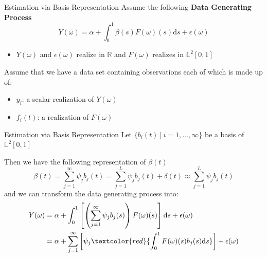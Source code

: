 \documentclass{beamer}
\begin{document}

	\begin{frame}{Estimation via Basis Representation}
		Assume the following \textbf{Data Generating Process}
		$$Y(\omega) = \alpha + \int_{0}^{1} \beta(s) F(\omega)(s) \mathrm{d}s + \epsilon(\omega)$$
		\begin{itemize}
			\item $Y(\omega)$ and $\epsilon(\omega)$ realize in $\mathbb{R}$ and $F(\omega)$ realizes in $\mathbb{L}^2[0,1]$
		\end{itemize}
		\vspace{0.2cm}
		
		Assume that we have a data set containing observations each of which is made up of:
		\begin{itemize}
			\item $y_i$: a scalar realization of $Y(\omega)$
			\item $f_i(t)$: a realization of $F(\omega)$
		\end{itemize}

	\end{frame}

	\begin{frame}{Estimation via Basis Representation}
		Let $\{b_i(t) \: \vert \: i = 1, \dots, \infty\}$ be a basis of $\mathbb{L}^2[0,1]$
		\vspace{0.2cm}
		
		Then we have the following representation of $\beta(t)$
		$$\beta(t) = \sum_{j = 1}^{\infty} \psi_j b_j(t) = \sum_{j = 1}^{L} \psi_j b_j(t) + \delta(t) \approx \sum_{j = 1}^{L} \psi_j b_j(t)$$
		and we can transform the data generating process into:
		\begin{equation}\notag
			\begin{split}
				Y(\omega) & = \alpha + \int_{0}^{1}\left[\left(\sum_{j = 1}^{\infty} \psi_j  b_j(s)\right) F(\omega)(s) \right]\mathrm{d}s + \epsilon(\omega) \\
						  & = \alpha + \sum_{j = 1}^{\infty} \left[\psi_j \textcolor{red}{\int_{0}^{1} F(\omega)(s) b_j(s)\mathrm{d}s}\right] + \epsilon(\omega)	  
			\end{split}
		\end{equation}
	\end{frame}
\end{document}
